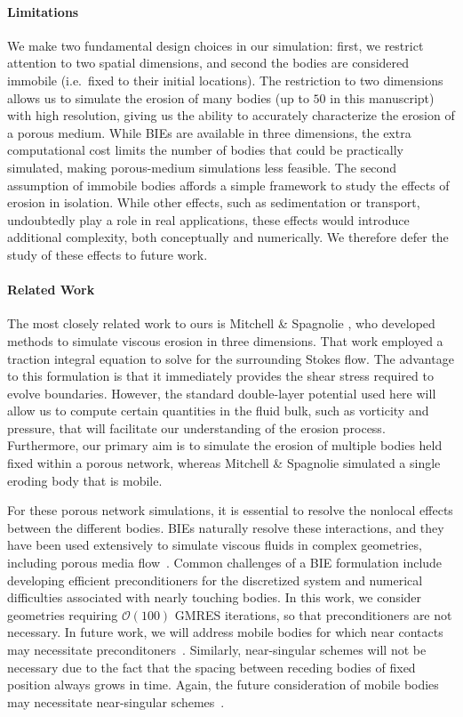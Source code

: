 \documentclass[preprint, 10pt]{elsarticle}
\begin{document}
\paragraph{Limitations}
We make two fundamental design choices in our simulation: first, we restrict attention to
two spatial dimensions, and second the bodies are considered immobile
(i.e.~fixed to their initial locations). The restriction to two
dimensions allows us to simulate the erosion of many bodies (up to $50$
in this manuscript) with high resolution, giving us the ability to
accurately characterize the erosion of a porous medium. While BIEs are
available in three dimensions, the extra computational cost limits the
number of bodies that could be practically simulated, making
porous-medium simulations less feasible. The second assumption of
immobile bodies affords a simple framework to study the effects of
erosion in isolation. While other effects, such as sedimentation or
transport, undoubtedly play a role in real applications, these effects
would introduce additional complexity, both conceptually and
numerically. We therefore defer the study of these effects to future
work.

\paragraph{Related Work}

The most closely related work to ours is Mitchell \& Spagnolie \cite{mit-spa2016}, who developed methods to simulate viscous erosion in three dimensions. That work employed a traction integral equation to solve for the surrounding Stokes flow. The advantage to this formulation is that it immediately provides the shear stress required to evolve boundaries. However, the standard double-layer potential used here will allow us to compute certain quantities in the fluid bulk, such as vorticity and pressure, that will facilitate our understanding of the erosion process. Furthermore, our primary aim is to simulate the erosion of multiple bodies held fixed within a porous network, whereas Mitchell \& Spagnolie simulated a single eroding body that is mobile.

For these porous network simulations, it is essential to resolve the
nonlocal effects between the different bodies.  BIEs naturally resolve
these interactions, and they have been used extensively to simulate
viscous fluids in complex geometries, including porous media
flow~\cite{dea-qua-bir-jua2018, bar-mar-vee-zha2018}.  Common challenges
of a BIE formulation include developing efficient preconditioners for
the discretized system and numerical difficulties associated with nearly
touching bodies. In this work, we consider geometries requiring
$\mathcal{O}(100)$ GMRES iterations, so that preconditioners are not
necessary. In future work, we will address mobile bodies for which near
contacts may necessitate preconditoners~\cite{qua-bir2015a,
qua-cou-dar2018, cou-pou-dar2017}. Similarly, near-singular schemes will
not be necessary due to the fact that the spacing between receding
bodies of fixed position always grows in time. Again, the future
consideration of mobile bodies may necessitate near-singular
schemes~\cite{qua-bir2014a, klo-bar-gre-one2013, bar-wu-vee2015,
hel-oja2008a, bea-lai2001}.
\end{document}
